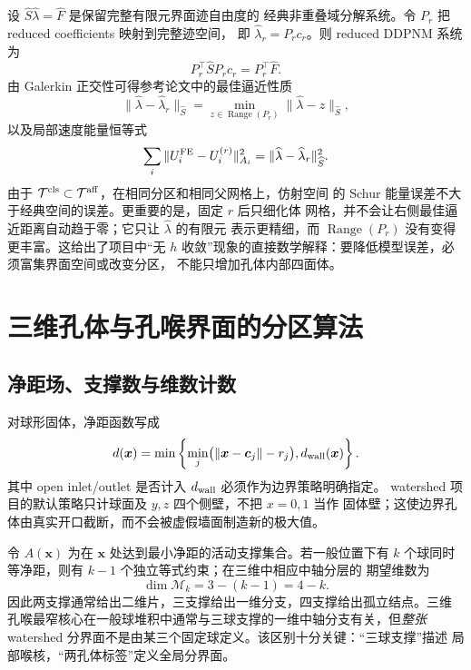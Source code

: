 \documentclass[UTF8,zihao=-4]{ctexart}
\newcommand{\T}{\mathcal{T}}
\newcommand{\Range}{\operatorname{Range}}
\begin{document}
设 $\widehat S\widehat\lambda=\widehat F$ 是保留完整有限元界面迹自由度的
经典非重叠域分解系统。令 $P_r$ 把 reduced coefficients 映射到完整迹空间，
即 $\widehat\lambda_r=P_rc_r$。则 reduced DDPNM 系统为
\begin{equation}\label{eq:galerkin-restriction}
  P_r^\top\widehat S P_rc_r=P_r^\top\widehat F.
\end{equation}
由 Galerkin 正交性可得参考论文中的最佳逼近性质
\begin{equation}\label{eq:best-approx}
  \|\widehat\lambda-\widehat\lambda_r\|_{\widehat S}
  =\min_{z\in\Range(P_r)}
  \|\widehat\lambda-z\|_{\widehat S},
\end{equation}
以及局部速度能量恒等式
\begin{equation}\label{eq:energy-error}
  \sum_i\|U_i^{\rm FE}-U_i^{(r)}\|_{A_i}^2
  =\|\widehat\lambda-\widehat\lambda_r\|_{\widehat S}^2.
\end{equation}
由于 $\T^{\rm cls}\subset\T^{\rm aff}$，在相同分区和相同父网格上，仿射空间
的 Schur 能量误差不大于经典空间的误差。更重要的是，固定 $r$ 后只细化体
网格，并不会让右侧最佳逼近距离自动趋于零；它只让 $\widehat\lambda$ 的有限元
表示更精细，而 $\Range(P_r)$ 没有变得更丰富。这给出了项目中``无 $h$
收敛''现象的直接数学解释：要降低模型误差，必须富集界面空间或改变分区，
不能只增加孔体内部四面体。

\section{三维孔体与孔喉界面的分区算法}

\subsection{净距场、支撑数与维数计数}

对球形固体，净距函数写成
\begin{equation}\label{eq:clearance}
  d(\bm x)=\min\left\{
    \min_j\bigl(\|\bm x-\bm c_j\|-r_j\bigr),
    d_{\rm wall}(\bm x)
  \right\}.
\end{equation}
其中 open inlet/outlet 是否计入 $d_{\rm wall}$ 必须作为边界策略明确指定。
watershed 项目的默认策略只计球面及 $y,z$ 四个侧壁，不把 $x=0,1$ 当作
固体壁；这使边界孔体由真实开口截断，而不会被虚假墙面制造新的极大值。

令 $A(\bm x)$ 为在 $\bm x$ 处达到最小净距的活动支撑集合。若一般位置下有
$k$ 个球同时等净距，则有 $k-1$ 个独立等式约束；在三维中相应中轴分层的
期望维数为
\begin{equation}\label{eq:support-dimension}
  \dim \mathcal M_k=3-(k-1)=4-k.
\end{equation}
因此两支撑通常给出二维片，三支撑给出一维分支，四支撑给出孤立结点。三维
孔喉最窄核心在一般球堆积中通常与三球支撑的一维中轴分支有关，但\emph{整张}
watershed 分界面不是由某三个固定球定义。该区别十分关键：``三球支撑''描述
局部喉核，``两孔体标签''定义全局分界面。
\end{document}
